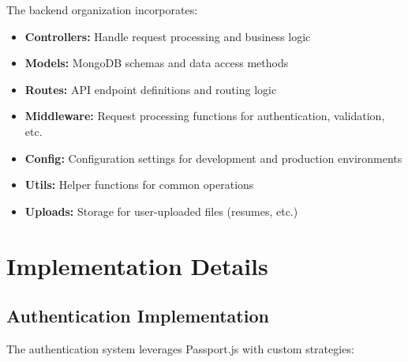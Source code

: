 \documentclass[12pt,a4paper]{report}
\begin{document}
The backend organization incorporates:
\begin{itemize}
    \item \textbf{Controllers:} Handle request processing and business logic
    \item \textbf{Models:} MongoDB schemas and data access methods
    \item \textbf{Routes:} API endpoint definitions and routing logic
    \item \textbf{Middleware:} Request processing functions for authentication, validation, etc.
    \item \textbf{Config:} Configuration settings for development and production environments
    \item \textbf{Utils:} Helper functions for common operations
    \item \textbf{Uploads:} Storage for user-uploaded files (resumes, etc.)
\end{itemize}

\chapter{Implementation Details}

\section{Authentication Implementation}
The authentication system leverages Passport.js with custom strategies:
\end{document}
